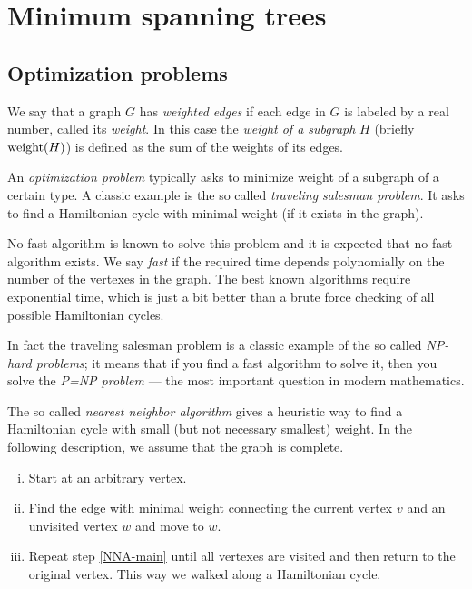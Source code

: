 \chapter{Minimum spanning trees}


\section*{Optimization problems}

We say that a graph $G$ has \emph{weighted edges} if each edge in $G$ is labeled by a real number, called its \emph{weight}.
In this case the \emph{weight of a subgraph} $H$ (briefly $\mathop{\rm weight}\nolimits(H)$) is defined as the sum of the weights of its edges.

An {}\emph{optimization problem} typically asks to minimize weight of a subgraph of a certain type.
A classic example is the so called \emph{traveling salesman problem}.
It asks to find a Hamiltonian cycle with minimal weight (if it exists in the graph).

No fast algorithm is known to solve this problem and it is expected that no fast algorithm exists.
We say {}\emph{fast} if the required time depends polynomially on the number of the vertexes in the graph.
The best known algorithms require exponential time, which is just a bit better than a brute force checking of all possible Hamiltonian cycles.

In fact the traveling salesman problem is a classic example of the so called {}\emph{NP-hard problems}; it means that if you find a fast algorithm to solve it, then you solve the \emph{P=NP problem} --- the most important question in modern mathematics.

The so called \emph{nearest neighbor algorithm} gives a heuristic way to find a Hamiltonian cycle with small (but not necessary smallest) weight.
In the following description, we assume that the graph is complete.
\begin{enumerate}[(i)]
\item Start at an arbitrary vertex.
\item\label{NNA-main} Find the edge with minimal weight connecting the current vertex $v$ and an unvisited vertex $w$ and move to $w$.
\item Repeat step \ref{NNA-main} until all vertexes are visited and then return to the original vertex.
This way we walked along a Hamiltonian cycle.
\end{enumerate}

